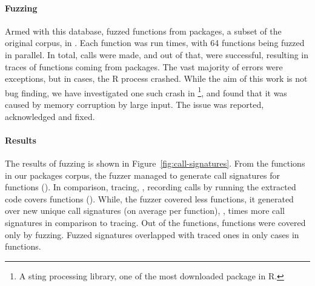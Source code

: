 \documentclass[sigplan,nonacm,anonymous,review]{acmart}
\begin{document}
\paragraph{Fuzzing}

Armed with this database, \tool fuzzed \UFNumFunctions functions from \UFNumPackages packages, a subset of the original corpus, in \UFTracingTime.
Each function was run \UFTracingBudget times, with 64 functions being fuzzed in parallel.
In total, \UFNumTracesRnd calls were made, and out of that, \UFRatioSucesssTraces were successful, resulting in \UFNumSuccessTraces traces of \UFNumSuccessFunctions functions coming from \UFNumSuccessPackages packages.
The vast majority of errors were exceptions, but in \UFNumCrashedRSessions cases, the R process crashed.
While the aim of this work is not bug finding, we have investigated one such crash in \footnote{A sting processing library, one of the most downloaded package in R.}, and found that it was caused by memory corruption by large input.
The issue was reported, acknowledged and fixed.

\paragraph{Results}

The results of fuzzing is shown in Figure~\ref{fig:call-signatures}.
From the \UFNumFunctions functions in our \UFNumPackages packages corpus, the fuzzer managed to generate call signatures for \UFNumFunctionsSignatrSignature functions (\UFNumFunctionsSignatrToCorpusSignatureRatio).
In comparison, tracing, \Ie, recording calls by running the extracted code covers \UFNumFunctionsBaselineSignature functions (\UFNumFunctionsBaselineToCorpusSignatureRatio).
While, the fuzzer covered less functions, it generated over \UFSignatrSignaturesRnd new unique call signatures (on average \UFAvgNewSignatrSignature per function), \Ie, \UFSignatrBaselineSignaturesRatio times more call signatures in comparison to tracing.
Out of the \UFNumFunctionsSignatrSignature functions, \UFNumFunctionsOnlySignatrSignature functions were covered only by fuzzing.
Fuzzed signatures overlapped with traced ones in only \UFSharedSignatures cases in \UFSharedSignatuesFunctions functions.
\end{document}
